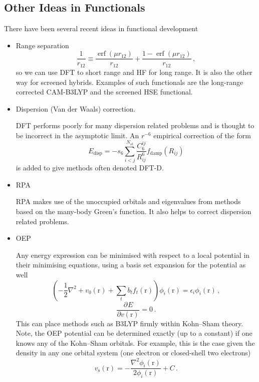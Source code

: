 \documentclass{article}
\theoremstyle{plain}\theoremheaderfont{\normalfont\itshape}\theorembodyfont{\rmfamily}\theoremseparator{.}\newtheorem*{rem}{Remark}\newtheorem*{ex}{Example}\newtheorem*{proof}{Proof}\newtheorem*{altp}{Alternative proof}
\theoremstyle{plain}\theoremheaderfont{\normalfont\bfseries}\theorembodyfont{\rmfamily}\theoremseparator{.}\newtheorem{thm}{Theorem}[section]\newtheorem{lem}[thm]{Lemma}\newtheorem{prop}[thm]{Proposition}\newtheorem*{cor}{Corollary}\newtheorem{defn}[thm]{Definition}\newtheorem{clm}[thm]{Claim}\newtheorem{clminproof}{Claim}
\theoremstyle{break}\theoremheaderfont{\normalfont\itshape}\theorembodyfont{\rmfamily}\theoremseparator{.\medskip}\newtheorem*{proofskip}{Proof}\newtheorem*{exs}{Examples}\newtheorem*{rems}{Remarks}
\theoremstyle{break}\theoremheaderfont{\normalfont\bfseries}\theorembodyfont{\rmfamily}\theoremseparator{.\medskip}\newtheorem{lemskip}[thm]{Lemma}\newtheorem{defnskip}[thm]{Definition}\newtheorem{propskip}[thm]{Proposition}\newtheorem{thmskip}[thm]{Theorem}
\numberwithin{equation}{section}
\newcommand{\pdv}[3][]{\frac{\partial^{#1} #2}{{\partial #3}^{#1}}}
\newcommand{\vb}[1]{\bm{\mathrm{#1}}}
\newcommand{\laplacian}{\nabla^2}
\DeclareMathOperator*{\erf}{\operatorname{erf}}
\newcommand{\s}{_{\text{s}}}
\begin{document}
    \subsection{Other Ideas in Functionals}
    There have been several recent ideas in functional development
    \begin{itemize}
        \item Range separation
        \begin{equation}
            \frac{1}{r_{12}}\equiv\frac{\erf(\mu r_{12})}{r_{12}}+\frac{1-\erf(\mu r_{12})}{r_{12}}\,,
        \end{equation}
        so we can use DFT to short range and HF for long range. It is also the other way for screened hybrids. Examples of such functionals are the long-range corrected CAM-B3LYP and the screened HSE functional.
        \item Dispersion (Van der Waals) correction.
        
        DFT performs poorly for many dispersion related problems and is thought to be incorrect in the asymptotic limit. An \(r^{-6}\) empirical correction of the form
        \begin{equation}
            E_{\text{disp}}=-s_6\sum_{i<j}^{N_{\text{at}}}\frac{C_6^{ij}}{R_{ij}^6}f_{\text{damp}}(R_{ij})
        \end{equation}
        is added to give methods often denoted DFT-D.
        \item RPA
        
        RPA makes use of the unoccupied orbitals and eigenvalues from methods based on the many-body Green's function. It also helps to correct dispersion related problems.

        \item OEP
        
        Any energy expression can be minimised with respect to a local potential in their minimising equations, using a basis set expansion for the potential as well
        \begin{equation}
            \left(-\frac{1}{2}\laplacian+v_0(\vb{r})+\sum_t b_tf_t(\vb{r})\right)\phi_i(\vb{r})=\epsilon_i\phi_i(\vb{r})\,,
        \end{equation}
        \begin{equation}
            \pdv{E}{v(\vb{r})}=0\,.
        \end{equation}
        This can place methods such as B3LYP firmly within Kohn--Sham theory. Note, the OEP potential can be determined exactly (up to a constant) if one knows any of the Kohn--Sham orbitals. For example, this is the case given the density in any one orbital system (one electron or closed-shell two electrons)
        \begin{equation}
            v\s(\vb{r})=-\frac{\laplacian\phi_i(\vb{r})}{2\phi_i(\vb{r})}+C\,.
        \end{equation}
    \end{itemize}
\end{document}
